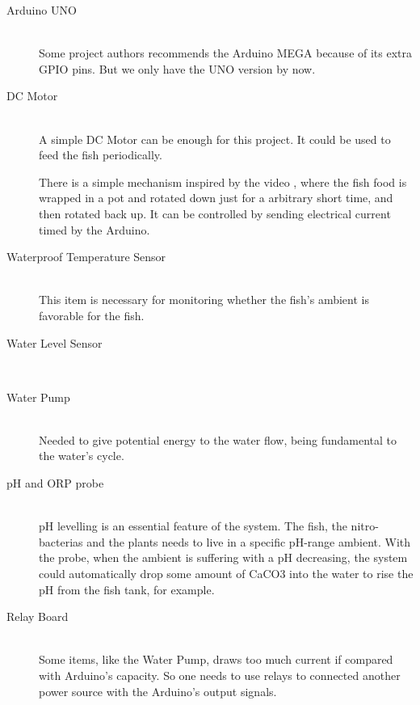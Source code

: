 \begin{description}
    \item[Arduino UNO] \hfill \\
        Some project authors recommends the Arduino MEGA because of its extra GPIO pins.
        But we only have the UNO version by now.
    \item[DC Motor] \hfill \\
        A simple DC Motor can be enough for this project.
        It could be used to feed the fish periodically.

        There is a simple mechanism inspired by the video \cite{dcmotor},
        where the fish food is wrapped in a pot and rotated down just for a arbitrary short time,
        and then rotated back up.
        It can be controlled by sending electrical current timed by the Arduino.
    \item[Waterproof Temperature Sensor] \hfill \\
        This item is necessary for monitoring whether the fish's ambient is favorable for the fish.
    \item[Water Level Sensor] \hfill \\
    \item[Water Pump] \hfill \\
        Needed to give potential energy to the water flow,
        being fundamental to the water's cycle.
    \item[pH and ORP probe] \hfill \\
        pH levelling is an essential feature of the system.
        The fish, the nitro-bacterias and the plants needs to live in a specific pH-range ambient.
        With the probe,
        when the ambient is suffering with a pH decreasing,
        the system could automatically drop some amount of CaCO3 into the water to rise the pH from the fish tank,
        for example.
    \item[Relay Board] \hfill \\
        Some items,
        like the Water Pump,
        draws too much current if compared with Arduino's capacity.
        So one needs to use relays to connected another power source with the Arduino's output signals.
\end{description}
